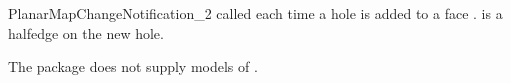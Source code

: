 \begin{ccRefConcept}{PlanarMapChangeNotification_2}
  {called each time a hole is added to a face .
   is a halfedge on the new hole.
  }

\ccHasModels

  The package does not supply models of
  .

\end{ccRefConcept}

\ccRefPageEnd
